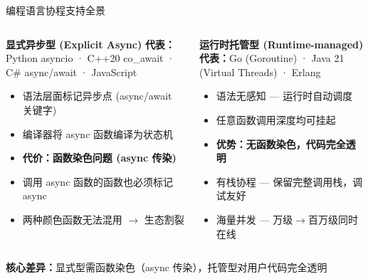 \begin{frame}{编程语言协程支持全景}
  \begin{columns}[T]
    \begin{block}{\textbf{显式异步型 (Explicit Async)}}
      \vspace{0.2em}
      {\footnotesize\textbf{代表：}Python asyncio · C++20 co\_await · C\# async/await · JavaScript}
      \vspace{0.2em}
      \begin{itemize}
        \item 语法层面标记异步点 (async/await 关键字)
        \item 编译器将 async 函数编译为状态机
        \item {\color{corRed}\textbf{代价：函数染色问题 (async 传染)}}
        \item 调用 async 函数的函数也必须标记 async
        \item 两种颜色函数无法混用 $\rightarrow$ 生态割裂
      \end{itemize}
    \end{block}

    \begin{exampleblock}{\textbf{运行时托管型 (Runtime-managed)}}
      \vspace{0.2em}
      {\footnotesize\textbf{代表：}Go (Goroutine) · Java 21 (Virtual Threads) · Erlang}
      \vspace{0.2em}
      \begin{itemize}
        \item 语法无感知 — 运行时自动调度
        \item 任意函数调用深度均可挂起
        \item {\color{corGreen}\textbf{优势：无函数染色，代码完全透明}}
        \item 有栈协程 — 保留完整调用栈，调试友好
        \item 海量并发 — 万级$\rightarrow$百万级同时在线
      \end{itemize}
    \end{exampleblock}
  \end{columns}

  \vspace{0.5em}
  \centering
  \textcolor{corRed}{\textbf{核心差异：}}显式型需函数染色（async 传染），托管型对用户代码完全透明
\end{frame}

